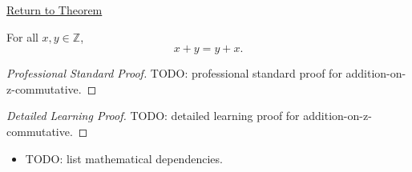 \newpage
{}
\label{prf:addition-on-z-commutative}

\begin{remark*}[Return]
\hyperref[thm:addition-on-z-commutative]{Return to Theorem}
\end{remark*}

\begin{theorem*}
For all $x,y\in\mathbb{Z}$,
\[
x+y=y+x.
\]
\end{theorem*}

\begin{proof}[Professional Standard Proof]
\LRAProofBodyStart
TODO: professional standard proof for addition-on-z-commutative.
\end{proof}

\begin{proof}[Detailed Learning Proof]
\LRAProofBodyStart
TODO: detailed learning proof for addition-on-z-commutative.
\end{proof}

\begin{remark*}
\end{remark*}

\begin{dependencies}
\begin{itemize}
  \item TODO: list mathematical dependencies.
\end{itemize}
\end{dependencies}

\clearpage
